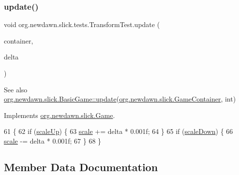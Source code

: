 \subsubsection{\texorpdfstring{update()}{update()}}
{\footnotesize\ttfamily void org.\+newdawn.\+slick.\+tests.\+Transform\+Test.\+update (\begin{DoxyParamCaption}\item[{\mbox{\hyperlink{classorg_1_1newdawn_1_1slick_1_1_game_container}{Game\+Container}}}]{container,  }\item[{int}]{delta }\end{DoxyParamCaption})\hspace{0.3cm}{\ttfamily [inline]}}

\begin{DoxySeeAlso}{See also}
\mbox{\hyperlink{classorg_1_1newdawn_1_1slick_1_1_basic_game_acfe6fa05aef83bff1631af91a3e4bd20}{org.\+newdawn.\+slick.\+Basic\+Game\+::update}}(\mbox{\hyperlink{classorg_1_1newdawn_1_1slick_1_1_game_container}{org.\+newdawn.\+slick.\+Game\+Container}}, int) 
\end{DoxySeeAlso}


Implements \mbox{\hyperlink{interfaceorg_1_1newdawn_1_1slick_1_1_game_ab07b2e9463ee4631620dde0de25bdee8}{org.\+newdawn.\+slick.\+Game}}.


\begin{DoxyCode}
61                                                            \{
62         \textcolor{keywordflow}{if} (\mbox{\hyperlink{classorg_1_1newdawn_1_1slick_1_1tests_1_1_transform_test_aae392ece0303e93157331a226863f789}{scaleUp}}) \{
63             \mbox{\hyperlink{classorg_1_1newdawn_1_1slick_1_1tests_1_1_transform_test_a3f9bd311b4aed7f2b69dac1f422e1547}{scale}} += delta * 0.001f;
64         \}
65         \textcolor{keywordflow}{if} (\mbox{\hyperlink{classorg_1_1newdawn_1_1slick_1_1tests_1_1_transform_test_a3f3abdb195eb3e8d3f94035370279110}{scaleDown}}) \{
66             \mbox{\hyperlink{classorg_1_1newdawn_1_1slick_1_1tests_1_1_transform_test_a3f9bd311b4aed7f2b69dac1f422e1547}{scale}} -= delta * 0.001f;
67         \}
68     \}
\end{DoxyCode}


\subsection{Member Data Documentation}
\mbox{\label{classorg_1_1newdawn_1_1slick_1_1tests_1_1_transform_test_a3f9bd311b4aed7f2b69dac1f422e1547}} 
